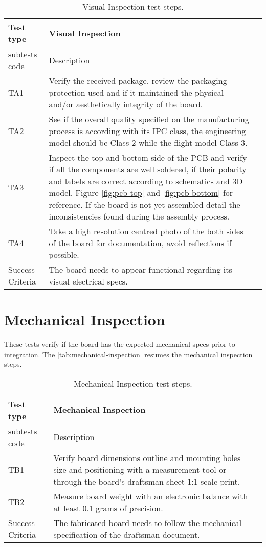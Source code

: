 \begin{table}[!htb]
\centering
\caption{Visual Inspection test steps.}
\label{tab:visual-inspection}
\begin{tabular}{m{3cm} m{12cm} m{3cm}}
\toprule
Test type & Visual Inspection \\
\midrule
\midrule
subtests code & Description \\ 
\midrule
TA1 & Verify the received package, review the packaging protection used and if it maintained the physical and/or aesthetically integrity of the board. \\
\midrule
TA2 & See if the overall quality specified on the manufacturing process is according with its IPC class, the engineering model should be Class 2 while the flight model Class 3. \\
\midrule
TA3 & Inspect the top and bottom side of the PCB and verify if all the components are well soldered, if their polarity and labels are correct according to schematics and 3D model. Figure \ref{fig:pcb-top} and \ref{fig:pcb-bottom} for reference. If the board is not yet assembled detail the inconsistencies found during the assembly process. \\
\midrule
TA4 & Take a high resolution centred photo of the both sides of the board for documentation, avoid reflections if possible. \\
\midrule
\midrule
Success Criteria & The board needs to appear functional regarding its visual electrical specs. \\
\bottomrule
\end{tabular}
\end{table}

\section {Mechanical Inspection}

These tests verify if the board has the expected mechanical specs prior to integration. The \autoref{tab:mechanical-inspection} resumes the mechanical inspection steps. 

\begin{table}[!htb]
\centering
\caption{Mechanical Inspection test steps.}
\label{tab:mechanical-inspection}
\begin{tabular}{m{3cm} m{12cm} m{3cm}}
\toprule
Test type & Mechanical Inspection \\
\midrule
\midrule
subtests code & Description \\ 
\midrule
TB1 & Verify board dimensions outline and mounting holes size and positioning with a measurement tool or through the board's draftsman sheet 1:1 scale print. \\
\midrule
TB2 & Measure board weight with an electronic balance with at least 0.1 grams of precision. \\
\midrule
\midrule
Success Criteria & The fabricated board needs to follow the mechanical specification of the draftsman document. \\
\bottomrule
\end{tabular}
\end{table}

